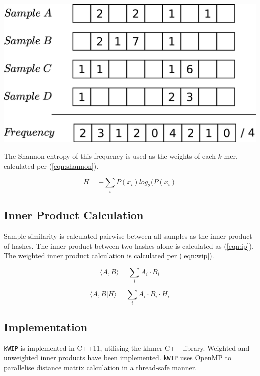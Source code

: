 \documentclass[a0,portrait]{a0poster}
\begin{document}
\begin{multicols}{2}
\begin{center}
  \vspace{1cm}
  \includegraphics[width=25cm]{freq_vector.png}
  \vspace{1cm}
\end{center}

The Shannon entropy of this frequency is used as the weights of each $k$-mer,
calculated per (\ref{eqn:shannon}).

\begin{equation}
    H = - \sum_{i} P(x_i) log_2(P(x_i)
\label{eqn:shannon}
\end{equation}

\subsection*{Inner Product Calculation}

Sample similarity is calculated pairwise between all samples as the inner
product of hashes. The inner product between two hashes alone is calculated as
(\ref{eqn:ip}). The weighted inner product calculation is calculated per
(\ref{eqn:wip}).

\begin{equation}
  \langle A, B \rangle = \sum_{i} A_i \cdot B_i
\label{eqn:ip}
\end{equation}

\begin{equation}
  \langle A, B | H \rangle = \sum_{i} A_i \cdot B_i \cdot H_i
\label{eqn:wip}
\end{equation}

\subsection*{Implementation}

\texttt{kWIP} is implemented in C++11, utilising the khmer C++ library. Weighted
and unweighted inner products have been implemented. \texttt{kWIP} uses OpenMP
to parallelise distance matrix calculation in a thread-safe manner.



\end{multicols}
\end{document}
